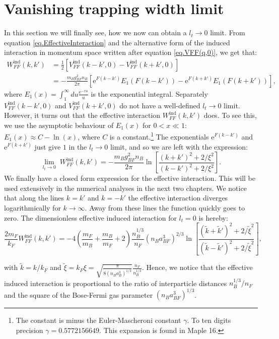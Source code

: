 \section{Vanishing trapping width limit}
In this section we will finally see, how we now can obtain a $l_t\to 0$ limit. From equation \eqref{eq.EffectiveInteraction} and the alternative form of the induced interaction in momentum space written after equation \eqref{eq.VFF(q,0)}, we get that:
\begin{align}
W^\text{ind}_{FF}(k,k') &= \frac{1}{2}\left[V^\text{ind}_{FF}(k-k',0) - V^\text{ind}_{FF}(k+k',0)\right] \nonumber \\
&= -\frac{m_Bg_{BF}^2n_B}{2\pi}\left[ \text{e}^{F(k-k')} E_1(F(k-k')) - \text{e}^{F(k+k')} E_1(F(k+k')) \right], \nonumber
\end{align}
where $E_1(x) = \int_1^\infty du \frac{\text{e}^{-xu}}{u}$ is the exponential integral. Separately $V^\text{ind}_{FF}(k-k',0)$ and $V^\text{ind}_{FF}(k+k',0)$ do not have a well-defined $l_t \to 0$ limit. However, it turns out that the effective interaction $W^\text{ind}_{FF}(k,k')$ does. To see this, we use the asymptotic behaviour of $E_1(x)$ for $0 < x \ll 1$: $E_1(x) \approx C -\ln(x)$, where $C$ is a constant.\footnote{The constant is minus the Euler-Mascheroni constant $\gamma$. To ten digits precision $\gamma = 0.5772156649$. This expansion is found in Maple 16.} The exponentials $\text{e}^{F(k-k')}$ and $\text{e}^{F(k+k')}$ just give $1$ in the $l_t \to 0$ limit, and so we are left with the expression:
\begin{equation}
\lim_{l_t \to 0} \; W^\text{ind}_{FF}(k,k') = -\frac{m_Bg_{BF}^2n_B}{2\pi} \ln\left[\frac{(k+k')^2+2/\xi^2}{(k-k')^2+2/\xi^2}\right].
\label{eq.EffectiveInteractionlt=0} 
\end{equation}
We finally have a closed form expression for the effective interaction. This will be used extensively in the numerical analyses in the next two chapters. We notice that along the lines $k = k'$ and $k = -k'$ the effective interaction diverges logarithmically for $k\to \infty$. Away from these lines the function quickly goes to zero. The dimensionless effective induced interaction for $l_t = 0$ is hereby:
\begin{equation}
\frac{2m_F}{k_F} W^\text{ind}_{FF}(k,k') = - 4\left( \frac{m_F}{m_B} + \frac{m_B}{m_F} + 2 \right) \frac{n_B^{1/3}}{n_F}(n_Ba_{BF}^3)^{2/3} \ln\left[\frac{(\tilde{k}+\tilde{k}')^2+2/\tilde{\xi}^2}{(\tilde{k}-\tilde{k}')^2+2/\tilde{\xi}^2}\right],
\label{eq.EffectiveInteractionlt=0dimensionless} 
\end{equation}

with $\tilde{k} = k/k_F$ and $\tilde{\xi} = k_F\xi = \sqrt{ \frac{ \pi }{ 8(n_Ba_B^3)^{1/3} } } \frac{n_F}{n_B^{1/3}}$. Hence, we notice that the effective induced interaction is proportional to the ratio of interparticle distances $n_B^{1/3}/n_F$ and the square of the Bose-Fermi gas parameter $(n_Ba_{BF}^3)^{1/3}$. 




